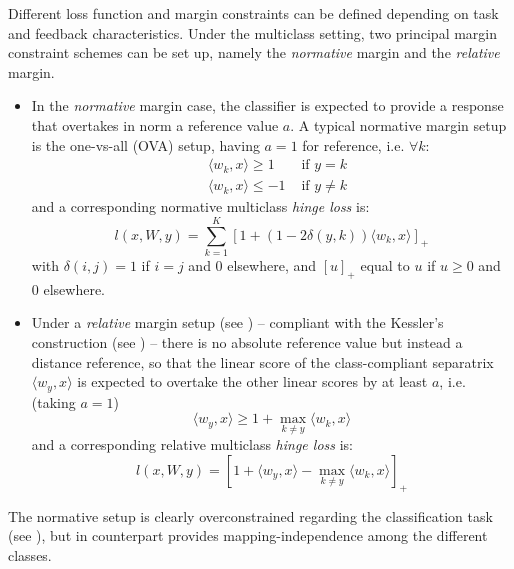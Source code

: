 \documentclass[preprint,12pt,authoryear]{elsarticle}
\begin{document}
Different loss function and margin constraints can be defined depending on task and feedback characteristics. 
Under the multiclass setting, two principal margin constraint schemes can be set up, namely the \emph{normative} margin and the \emph{relative} margin. 

\begin{itemize}
	\item In the \emph{normative} margin case, the classifier is expected to provide a response that overtakes in norm a reference value $a$. A typical normative margin setup is the one-vs-all (OVA) setup, having  $a = 1$ for reference,  i.e. $\forall k$: \begin{align}%
	&\langle w_k, x \rangle \geq 1 &\text{ if } y = k \label{eq:OVA-A}\\
	&\langle w_k, x \rangle \leq -1 &\text{ if }y \neq k \label{eq:OVA-B}
	\end{align}
	and a corresponding normative multiclass \emph{hinge loss} is:  
	\begin{equation}\label{eq:OVA-loss} l(x,W,y) = \sum_{k=1}^K \left[1 + (1 - 2 \delta(y,k)) \langle w_k,x \rangle\right]_+
	\end{equation}
	with $\delta(i,j) =1$ if $i = j$ and 0 elsewhere, and $[u]_+$ equal to $u$ if $u\geq 0$ and 0 elsewhere.
	\item Under  a \emph{relative} margin setup (see \cite{crammer2003ultraconservative}) \--- compliant with the Kessler's construction (see \cite{duda1973pattern}) \--- there is no absolute reference value but instead a distance reference, so that the linear score of the class-compliant separatrix $\langle w_y, x\rangle$ is expected to overtake  the other linear scores by at least $a$, i.e. (taking $a=1$)
	\begin{equation}
 \label{eq:rel} \langle w_y, x \rangle \geq 1 + \max_{k \neq y} \langle w_k, x \rangle  	
 \end{equation}
	and a corresponding relative multiclass \emph{hinge loss} is:
	\begin{equation}
	\label{eq:rel-loss} l (x,W,y) =  \left[ 1 +  \langle w_y, x \rangle - \max_{k \neq y} \langle w_k, x\rangle\right]_+\end{equation}
\end{itemize}


The normative setup is clearly overconstrained regarding the classification task (see \cite{crammer2003ultraconservative}), but in counterpart provides mapping-independence among the different classes.
\end{document}
